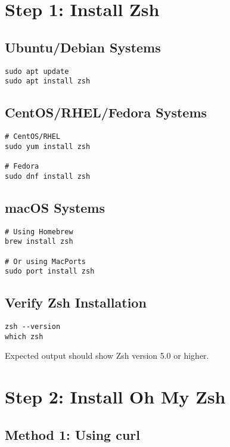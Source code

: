 \documentclass{article}
\begin{document}
\section{Step 1: Install Zsh}

\subsection{Ubuntu/Debian Systems}

\begin{verbatim}
sudo apt update
sudo apt install zsh
\end{verbatim}

\subsection{CentOS/RHEL/Fedora Systems}

\begin{verbatim}
# CentOS/RHEL
sudo yum install zsh

# Fedora
sudo dnf install zsh
\end{verbatim}

\subsection{macOS Systems}

\begin{verbatim}
# Using Homebrew
brew install zsh

# Or using MacPorts
sudo port install zsh
\end{verbatim}

\subsection{Verify Zsh Installation}

\begin{verbatim}
zsh --version
which zsh
\end{verbatim}

Expected output should show Zsh version 5.0 or higher.

\section{Step 2: Install Oh My Zsh}

\subsection{Method 1: Using curl}
\end{document}
